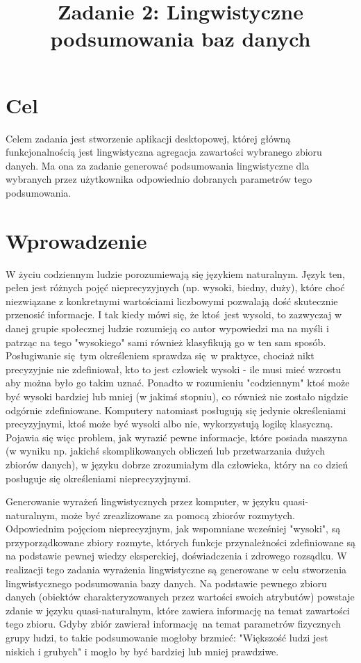 \documentclass{classrep}
\author{
    \studentinfo{Jan Karwowski}{216793} \and
    \studentinfo{Kamil Kowalewski}{216806}
}
\title{Zadanie 2: Lingwistyczne podsumowania baz danych}
\begin{document}
    \maketitle

    \section{Cel} {
        Celem zadania jest stworzenie aplikacji desktopowej, której główną funkcjonalnością jest lingwistyczna agregacja
        zawartości wybranego zbioru danych. Ma ona za zadanie generować podsumowania lingwistyczne dla wybranych przez
        użytkownika odpowiednio dobranych parametrów tego podsumowania.
    }
    \section{Wprowadzenie} {
        W życiu codziennym ludzie porozumiewają się językiem naturalnym. Język ten, pełen jest
        różnych pojęć nieprecyzyjnych (np. wysoki, biedny, duży), które choć niezwiązane z
        konkretnymi wartościami liczbowymi pozwalają dość skutecznie przenosić informacje. I tak
        kiedy mówi się, że ktoś jest wysoki, to zazwyczaj w danej grupie społecznej ludzie rozumieją
        co autor wypowiedzi ma na myśli i patrząc na tego "wysokiego" sami również klasyfikują go w
        ten sam sposób. Posługiwanie się tym określeniem sprawdza się w praktyce, chociaż nikt
        precyzyjnie nie zdefiniował, kto to jest człowiek wysoki - ile musi mieć wzrostu aby można
        było go takim uznać. Ponadto w rozumieniu "codziennym" ktoś może być wysoki bardziej lub
        mniej (w jakimś stopniu), co również nie zostało nigdzie odgórnie zdefiniowane. Komputery
        natomiast posługują się jedynie określeniami precyzyjnymi, ktoś może być wysoki albo nie,
        wykorzystują logikę klasyczną. Pojawia się więc problem, jak wyrazić pewne informacje, które
        posiada maszyna (w wyniku np. jakichś skomplikowanych obliczeń lub przetwarzania dużych
        zbiorów danych), w języku dobrze zrozumiałym dla człowieka, który na co dzień posługuje się
        określeniami nieprecyzyjnymi.

        Generowanie wyrażeń lingwistycznych przez komputer, w języku quasi-naturalnym, może być
        zreazlizowane za pomocą zbiorów rozmytych. Odpowiednim pojęciom nieprecyzjnym, jak
        wspomniane wcześniej "wysoki", są przyporządkowane zbiory rozmyte, których funkcje
        przynależności zdefiniowane są na podstawie pewnej wiedzy eksperckiej, doświadczenia i
        zdrowego rozsądku. W realizacji tego zadania wyrażenia lingwistyczne są generowane w celu
        stworzenia lingwistycznego podsumowania bazy danych. Na podstawie pewnego zbioru danych
        (obiektów charakteryzowanych przez wartości swoich atrybutów) powstaje zdanie w języku
        quasi-naturalnym, które zawiera informację na temat zawartości tego zbioru. Gdyby zbiór
        zawierał informację na temat parametrów fizycznych grupy ludzi, to takie podsumowanie
        mogłoby brzmieć: "Większość ludzi jest niskich i grubych" i mogło by być bardziej lub mniej
        prawdziwe.

}
\end{document}
